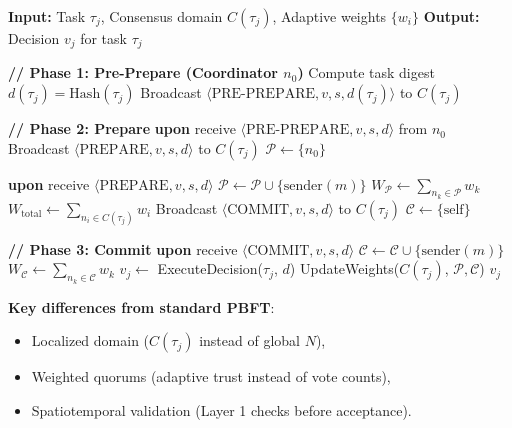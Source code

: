 \documentclass[lettersize,journal]{IEEEtran}
\providecommand{\UPON}[1]{\STATE \textbf{upon} #1}
\providecommand{\ENDUPON}{}
\begin{document}
\begin{algorithm}[t]
\caption{Weighted Three-Phase Consensus}
\label{alg:weighted_consensus}
\small
\begin{algorithmic}[1]
\STATE \textbf{Input:} Task $\tau_j$, Consensus domain $C(\tau_j)$, Adaptive weights $\{w_i\}$
\STATE \textbf{Output:} Decision $v_j$ for task $\tau_j$

\STATE \textbf{// Phase 1: Pre-Prepare (Coordinator $n_0$)}
\STATE Compute task digest $d(\tau_j) = \text{Hash}(\tau_j)$
\STATE Broadcast $\langle \text{PRE-PREPARE}, v, s, d(\tau_j) \rangle$ to $C(\tau_j)$
\ENDIF

\STATE \textbf{// Phase 2: Prepare}
\UPON{receive $\langle \text{PRE-PREPARE}, v, s, d \rangle$ from $n_0$}
\STATE Broadcast $\langle \text{PREPARE}, v, s, d \rangle$ to $C(\tau_j)$
\STATE $\mathcal{P} \gets \{n_0\}$ 
\ENDIF
\ENDUPON

\UPON{receive $\langle \text{PREPARE}, v, s, d \rangle$}
\STATE $\mathcal{P} \gets \mathcal{P} \cup \{\text{sender}(m)\}$
\STATE $W_{\mathcal{P}} \gets \sum_{n_k \in \mathcal{P}} w_k$ 
\STATE $W_{\text{total}} \gets \sum_{n_i \in C(\tau_j)} w_i$
\STATE Broadcast $\langle \text{COMMIT}, v, s, d \rangle$ to $C(\tau_j)$
\STATE $\mathcal{C} \gets \{\text{self}\}$ 
\ENDIF
\ENDIF
\ENDUPON

\STATE \textbf{// Phase 3: Commit}
\UPON{receive $\langle \text{COMMIT}, v, s, d \rangle$}
\STATE $\mathcal{C} \gets \mathcal{C} \cup \{\text{sender}(m)\}$
\STATE $W_{\mathcal{C}} \gets \sum_{n_k \in \mathcal{C}} w_k$
\STATE $v_j \gets$ ExecuteDecision($\tau_j$, $d$)
\STATE UpdateWeights($C(\tau_j)$, $\mathcal{P}, \mathcal{C}$) 
\RETURN $v_j$
\ENDIF
\ENDIF
\ENDUPON
\end{algorithmic}
\end{algorithm}

\textbf{Key differences from standard PBFT}:
\begin{itemize}
\item Localized domain ($C(\tau_j)$ instead of global $N$),
\item Weighted quorums (adaptive trust instead of vote counts),
\item Spatiotemporal validation (Layer 1 checks before acceptance).
\end{itemize}
\end{document}
